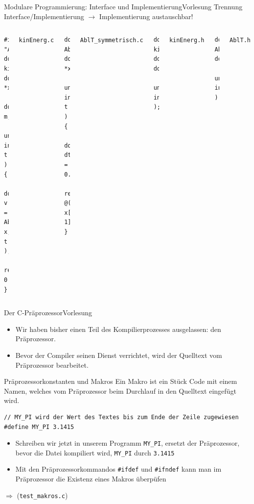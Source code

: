 \documentclass[xcolor=dvipsnames]{beamer}
\newcounter{lecturecounter}
\begin{document}
\begin{frame}[fragile]{Modulare Programmierung: Interface und Implementierung}{Vorlesung }
Trennung Interface/Implementierung $\rightarrow$ Implementierung austauschbar!
\begin{columns}[T]
    \begin{lstlisting}
#include "AblT.h"
double 
kinEnerg( double *x, 
          double m, 
          unsigned int t ) {
  double v = AblT( x, t );
  return 0.5*m*v*v;
}
    \end{lstlisting}
    \texttt{kinEnerg.c}
    \vspace{0.1cm}
    \begin{lstlisting}
double AblT( double *x, 
             unsigned int t ){
  double dt = 0.01;
  return @(x[t+1]-x[t-1])/(2*dt)@;
}
    \end{lstlisting}
    \texttt{AblT\_symmetrisch.c}
    \begin{lstlisting}
double kinEnerg( double*, double,
                 unsigned int );
    \end{lstlisting}
    \texttt{kinEnerg.h}
    \vspace{2.4cm}
    \begin{lstlisting}
double AblT( double*, 
             unsigned int );
    \end{lstlisting}
    \texttt{AblT.h}  
  \end{columns}
\end{frame}

\begin{frame}[fragile]{Der C-Präprozessor}{Vorlesung }
\begin{block}{}
  \begin{itemize}
    \item{Wir haben bisher einen Teil des Kompilierprozesses ausgelassen: den Präprozessor.}
    \item{Bevor der Compiler seinen Dienst verrichtet, wird der Quelltext vom Präprozessor bearbeitet.}
  \end{itemize}
\end{block}
\begin{block}{Präprozessorkonstanten und Makros}
  Ein Makro ist ein Stück Code mit einem Namen, welches vom Präprozessor beim Durchlauf in den Quelltext eingefügt wird.
\end{block}
\begin{lstlisting}
// MY_PI wird der Wert des Textes bis zum Ende der Zeile zugewiesen
#define MY_PI 3.1415
\end{lstlisting}
\begin{itemize}
  \item{Schreiben wir jetzt in unserem Programm \verb|MY_PI|, ersetzt der Präprozessor, bevor die Datei kompiliert wird, \verb|MY_PI| durch \texttt{3.1415}}
  \item{Mit den Präprozessorkommandos \verb|#ifdef| und \verb|#ifndef| kann man im Präprozessor die Existenz eines Makros überpüfen}
\end{itemize}
$\Rightarrow$ (\verb|test_makros.c|)
\end{frame}
\end{document}
